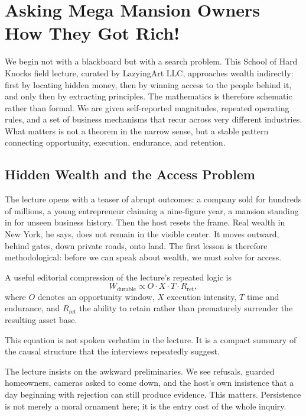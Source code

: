 \chapter{Asking Mega Mansion Owners How They Got Rich!}

We begin not with a blackboard but with a search problem. This School of Hard Knocks field lecture, curated by LazyingArt LLC, approaches wealth indirectly: first by locating hidden money, then by winning access to the people behind it, and only then by extracting principles. The mathematics is therefore schematic rather than formal. We are given self-reported magnitudes, repeated operating rules, and a set of business mechanisms that recur across very different industries. What matters is not a theorem in the narrow sense, but a stable pattern connecting opportunity, execution, endurance, and retention.

\section{Hidden Wealth and the Access Problem}

The lecture opens with a teaser of abrupt outcomes: a company sold for hundreds of millions, a young entrepreneur claiming a nine-figure year, a mansion standing in for unseen business history. Then the host resets the frame. Real wealth in New York, he says, does not remain in the visible center. It moves outward, behind gates, down private roads, onto land. The first lesson is therefore methodological: before we can speak about wealth, we must solve for access.

A useful editorial compression of the lecture's repeated logic is
\begin{equation}
W_{\mathrm{durable}} \propto O \cdot X \cdot T \cdot R_{\mathrm{ret}},
\end{equation}
where \(O\) denotes an opportunity window, \(X\) execution intensity, \(T\) time and endurance, and \(R_{\mathrm{ret}}\) the ability to retain rather than prematurely surrender the resulting asset base.

\begin{remark}
This equation is not spoken verbatim in the lecture. It is a compact summary of the causal structure that the interviews repeatedly suggest.
\end{remark}

The lecture insists on the awkward preliminaries. We see refusals, guarded homeowners, cameras asked to come down, and the host's own insistence that a day beginning with rejection can still produce evidence. This matters. Persistence is not merely a moral ornament here; it is the entry cost of the whole inquiry.

